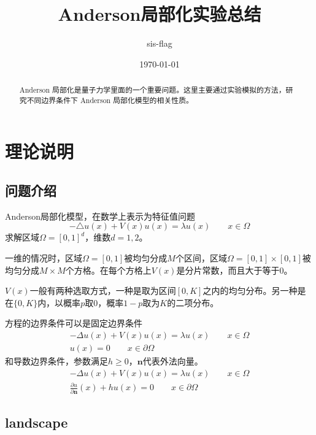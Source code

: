 \documentclass[12pt,a4paper]{article}
\title{Anderson局部化实验总结}
\author{sis-flag}
\date{\today}
\begin{document}
\maketitle

\begin{abstract}
Anderson 局部化是量子力学里面的一个重要问题。这里主要通过实验模拟的方法，研究不同边界条件下 Anderson 局部化模型的相关性质。
\end{abstract}

\section{理论说明}

\subsection{问题介绍}

Anderson局部化模型，在数学上表示为特征值问题
\begin{equation}
- \triangle u(x) + V(x) u(x) = \lambda u(x) \qquad x \in \Omega
\end{equation}
求解区域$\Omega = [0,1]^d$，维数$d = 1, 2$。

一维的情况时，区域$\Omega=[0,1]$被均匀分成$M$个区间，区域$\Omega=[0,1] \times [0,1]$被均匀分成$M \times M$个方格。在每个方格上$V(x)$是分片常数，而且大于等于0。

$V(x)$一般有两种选取方式，一种是取为区间$[0, K]$之内的均匀分布。另一种是在$\{0, K\}$内，以概率$p$取$0$，概率$1-p$取为$K$的二项分布。

方程的边界条件可以是固定边界条件
\begin{eqnarray}
- \Delta u(x) + V(x) u(x) = \lambda u(x) \qquad x \in \Omega \\
u(x) = 0 \qquad x \in \partial \Omega
\end{eqnarray}
和导数边界条件，参数满足$h \geq 0$，$\mathbf{n}$代表外法向量。
\begin{eqnarray}
- \Delta u(x) + V(x) u(x) = \lambda u(x) \qquad x \in \Omega \\
\frac{\partial u}{\partial \mathbf{n}}(x) + h u(x) = 0 \qquad x \in \partial \Omega
\end{eqnarray}

\subsection{landscape}
\end{document}
